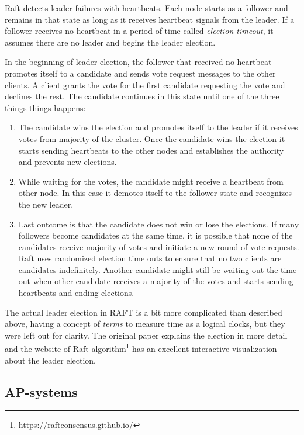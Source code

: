 Raft detects leader failures with heartbeats. Each node starts as a follower and
remains in that state as long as it receives heartbeat signals from the leader.
If a follower receives no heartbeat in a period of time called \emph{election
timeout}, it assumes there are no leader and begins the leader election.

In the beginning of leader election, the follower that received no heartbeat
promotes itself to a candidate and sends vote request messages to the other
clients. A client grants the vote for the first candidate requesting the vote
and declines the rest. The candidate continues in this state until one of the
three things things happens:

\begin{enumerate}
  \item The candidate wins the election and promotes itself to the leader if it
  receives votes from majority of the cluster. Once the candidate wins the
  election it starts sending heartbeats to the other nodes and establishes the
  authority and prevents new elections.
  \item While waiting for the votes, the candidate might receive a heartbeat
  from other node. In this case it demotes itself to the follower state and
  recognizes the new leader.
  \item Last outcome is that the candidate does not win or lose the elections.
  If many followers become candidates at the same time, it is possible that none
  of the candidates receive majority of votes and initiate a new round of
  vote requests. Raft uses randomized election time outs to ensure that no two
  clients are candidates indefinitely. Another candidate might still be waiting
  out the time out when other candidate receives a majority of the votes and
  starts sending heartbeats and ending elections.
\end{enumerate}

The actual leader election in RAFT is a bit more complicated than described
above, having a concept of \emph{terms} to measure time as a logical clocks, but
they were left out for clarity. The original paper explains the election in more
detail and the website of Raft
algorithm\footnote{\url{https://raftconsensus.github.io/}} has an excellent
interactive visualization about the leader election.

\subsection{AP-systems}

